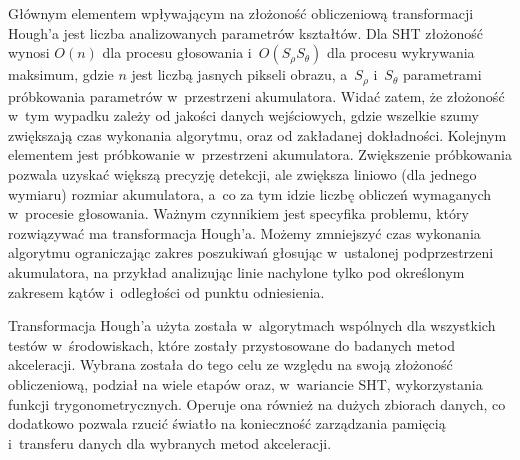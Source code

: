 Głównym elementem wpływającym na złożoność obliczeniową transformacji Hough'a jest liczba analizowanych parametrów kształtów. Dla SHT złożoność wynosi $O(n)$ dla procesu głosowania i~$O(S_\rho S_\theta)$ dla procesu wykrywania maksimum, gdzie $n$ jest liczbą jasnych pikseli obrazu, a~$S_\rho$ i~$S_\theta$ parametrami próbkowania parametrów w~przestrzeni akumulatora. Widać zatem, że złożoność w~tym wypadku zależy od jakości danych wejściowych, gdzie wszelkie szumy zwiększają czas wykonania algorytmu, oraz od zakładanej dokładności. Kolejnym elementem jest próbkowanie w~przestrzeni akumulatora. Zwiększenie próbkowania pozwala uzyskać większą precyzję detekcji, ale zwiększa liniowo (dla jednego wymiaru) rozmiar akumulatora, a~co za tym idzie liczbę obliczeń wymaganych w~procesie głosowania. Ważnym czynnikiem jest specyfika problemu, który rozwiązywać ma transformacja Hough'a. Możemy zmniejszyć czas wykonania algorytmu ograniczając zakres poszukiwań głosując w~ustalonej podprzestrzeni akumulatora, na przykład analizując linie nachylone tylko pod określonym zakresem kątów i~odległości od punktu odniesienia.

Transformacja Hough'a użyta została w~algorytmach wspólnych dla wszystkich testów w~środowiskach, które zostały przystosowane do badanych metod akceleracji. Wybrana została do tego celu ze względu na swoją złożoność obliczeniową, podział na wiele etapów oraz, w~wariancie SHT, wykorzystania funkcji trygonometrycznych. Operuje ona również na dużych zbiorach danych, co dodatkowo pozwala rzucić światło na konieczność zarządzania pamięcią i~transferu danych dla wybranych metod akceleracji. 
